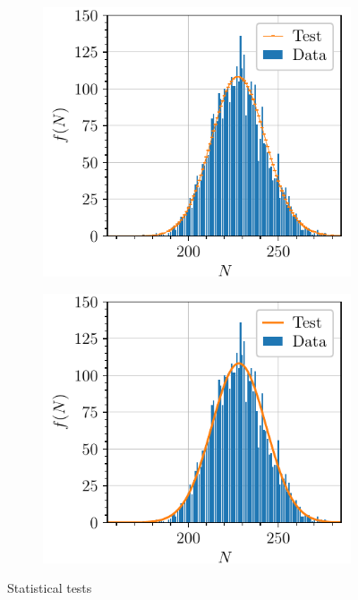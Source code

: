 \begin{figure}[htbp]
\begin{subfigure}{0.495\textwidth}
        \includegraphics[scale=1]{figures/highmean_poisson.pdf}
        \caption{}
    \end{subfigure}
    \hfill
    \begin{subfigure}{0.495\textwidth}
        \includegraphics[scale=1]{figures/highmean_gaussian.pdf}
        \caption{}
    \end{subfigure}
    \caption{Statistical tests}
    \label{fig:statistical_tests}
\end{figure}

